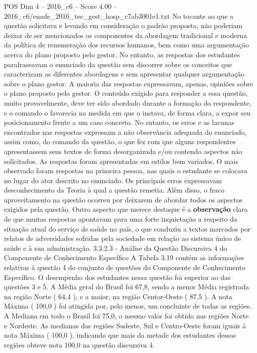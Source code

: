 \begin{textsample}{POS Dim 4 – 2016\_c6 – Score 4.00 – 2016\_c6/enade\_2016\_tec\_gest\_hosp\_c7ab3001e1.txt}
No tocante ao que a questão solicitava e levando em consideração o padrão proposto, não poderiam deixar de ser mencionados os componentes da abordagem tradicional e moderna da política de remuneração dos recursos humanos, bem como uma argumentação acerca do plano proposto pelo gestor.
No entanto, as respostas dos estudantes parafraseavam o enunciado da questão sem discorrer sobre os conceitos que caracterizam as diferentes abordagens e sem apresentar qualquer argumentação sobre o plano gestor.
A maioria das respostas expressavam, apenas, opiniões sobre o plano proposto pelo gestor.
O conteúdo exigido para responder a essa questão, muito provavelmente, deve ter sido abordado durante a formação do respondente, e o comando o favorecia na medida em que o instava, de forma clara, a expor seu posicionamento frente a um caso concreto.
No entanto, os erros e as lacunas encontrados nas respostas expressam a não observância adequada do enunciado, assim como, do comando da questão, o que fez com que alguns respondentes apresentassem seus textos de forma desorganizada e/ou contendo aspectos não solicitados.
As respostas foram apresentadas em estilos bem variados.
O mais observado foram respostas na primeira pessoa, nas quais o estudante se colocava no lugar do ator descrito no enunciado.
Os principais erros expressavam desconhecimento da Teoria à qual a questão remetia.
Além disso, o fraco aproveitamento na questão ocorreu por deixarem de abordar todos os aspectos exigidos pela questão.
Outro aspecto que merece destaque é a \textbf{observação} clara de que muitas respostas apontavam para uma forte inquietação a respeito da situação atual do serviço de saúde no país, o que conduziu a textos marcados por relatos de adversidades sofridas pela sociedade em relação ao sistema único de saúde e à sua administração. 3.3.2.3 - Análise da Questão Discursiva 4 do Componente de Conhecimento Específico A Tabela 3.19 contém as informações relativas à questão 4 do conjunto de questões do Componente de Conhecimento Específico.
O desempenho dos estudantes nessa questão foi superior ao das questões 3 e 5.
A Média geral do Brasil foi 67,8, sendo a menor Média registrada na região Norte ( 64,4 ), e a maior, na região Centor-Oeste ( 87,5 ).
A nota Máxima ( 100,0 ) foi atingida por, pelo menos, um concluinte de todas as regiões.
A Mediana em todo o Brasil foi 75,0, o mesmo valor foi obtido nas regiões Norte e Nordeste.
As medianas das regiões Sudeste, Sul e Centro-Oeste foram iguais à nota Máxima ( 100,0 ), indicando que mais da metade dos estudantes dessas regiões obteve nota 100,0 na questão discursiva 4.

\end{textsample}
